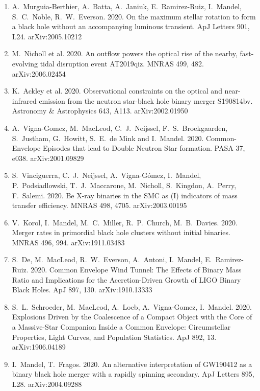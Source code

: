 \documentclass[margin,line]{res}
\begin{document}
\begin{resume}
\begin{enumerate}
\item A.~Murguia-Berthier, A.~Batta, A.~Janiuk, E.~Ramirez-Ruiz, I.~Mandel, S.~C.~Noble, R.~W.~Everson.  2020.  On the maximum stellar rotation to form a black hole without an accompanying luminous transient.  ApJ Letters 901, L24.  arXiv:2005.10212

\item M.~Nicholl et al. 2020. An outflow powers the optical rise of the nearby, fast-evolving tidal disruption event AT2019qiz. MNRAS 499, 482.  arXiv:2006.02454

\item K.~Ackley et al. 2020. Observational constraints on the optical and near-infrared emission from the neutron star-black hole binary merger S190814bv.  Astronomy \& Astrophysics 643, A113.
arXiv:2002.01950

\item A.~Vigna-Gomez, M.~MacLeod, C.~J.~Neijssel, F.~S.~Broekgaarden, S.~Justham, G.~Howitt, S.~E.~de Mink and I.~Mandel.  2020. Common-Envelope Episodes that lead to Double Neutron Star formation.  PASA 37, e038.  arXiv:2001.09829 

\item S.~Vinciguerra, C.~J.~Neijssel, A.~Vigna-G\'{o}mez, I.~Mandel, P.~Podsiadlowski, T.~J.~Maccarone, M.~Nicholl, S.~Kingdon, A.~Perry, F.~Salemi.  2020. Be X-ray binaries in the SMC as (I) indicators of mass transfer efficiency.  MNRAS 498, 4705.  arXiv:2003.00195

\item V.~Korol, I.~Mandel, M.~C.~Miller, R.~P.~Church, M.~B.~Davies. 2020. Merger rates in primordial black hole clusters without initial binaries. MNRAS 496, 994.  arXiv:1911.03483

\item S.~De, M.~MacLeod, R.~W.~Everson, A.~Antoni, I.~Mandel, E.~Ramirez-Ruiz.  2020.  Common Envelope Wind Tunnel: The Effects of Binary Mass Ratio and Implications for the Accretion-Driven Growth of LIGO Binary Black Holes.  ApJ 897, 130.  arXiv:1910.13333

\item S.~L.~Schroeder, M.~MacLeod, A.~Loeb, A.~Vigna-Gomez, I.~Mandel.  2020. Explosions Driven by the Coalescence of a Compact Object with the Core of a Massive-Star Companion Inside a Common Envelope: Circumstellar Properties, Light Curves, and Population Statistics.  ApJ 892, 13.  arXiv:1906.04189

\item I.~Mandel, T.~Fragos. 2020. An alternative interpretation of GW190412 as a binary black hole merger with a rapidly spinning secondary.  ApJ Letters 895, L28. arXiv:2004.09288


\end{enumerate}
\end{resume}
\end{document}
